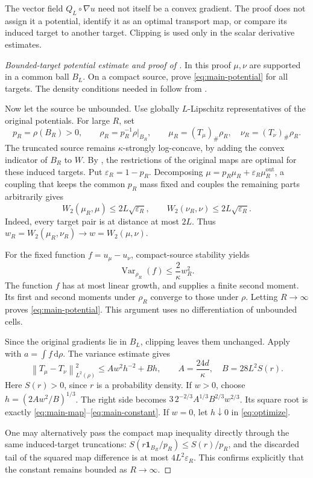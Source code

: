 \documentclass[11pt]{article}
\numberwithin{equation}{section}
\theoremstyle{remark}
\newcommand{\Var}{\operatorname{Var}}
\newcommand{\ind}{\mathbf 1}
\newcommand{\dd}{\,\mathrm d}
\newcommand{\norm}[1]{\left\lVert #1\right\rVert}
\begin{document}
The vector field $Q_L\circ\nabla u$ need not itself be a convex gradient. The proof does not assign it a potential, identify it as an optimal transport map, or compare its induced target to another target. Clipping is used only in the scalar derivative estimates.

\begin{proof}[Bounded-target potential estimate and proof of ]
In this proof $\mu,\nu$ are supported in a common ball $B_L$. On a compact source,  prove \eqref{eq:main-potential} for all targets. The density conditions needed in  follow from .

Now let the source be unbounded. Use globally $L$-Lipschitz representatives of the original potentials. For large $R$, set
\[
 p_R=\rho(B_R)>0,\qquad \rho_R=p_R^{-1}\rho|_{B_R},\qquad
 \mu_R=(T_\mu)_\#\rho_R,\quad \nu_R=(T_\nu)_\#\rho_R.
\]
The truncated source remains $\kappa$-strongly log-concave, by adding the convex indicator of $B_R$ to $W$. By , the restrictions of the original maps are optimal for these induced targets. Put $\varepsilon_R=1-p_R$. Decomposing
$\mu=p_R\mu_R+\varepsilon_R\mu_R^{\mathrm{out}}$, a coupling that keeps the common $p_R$ mass fixed and couples the remaining parts arbitrarily gives
\begin{equation}\label{eq:induced-target-bound}
 W_2(\mu_R,\mu)\le2L\sqrt{\varepsilon_R},\qquad
 W_2(\nu_R,\nu)\le2L\sqrt{\varepsilon_R}.
\end{equation}
Indeed, every target pair is at distance at most $2L$. Thus $w_R=W_2(\mu_R,\nu_R)\to w=W_2(\mu,\nu)$.

For the fixed function $f=u_\mu-u_\nu$, compact-source stability yields
\[
 \Var_{\rho_R}(f)\le\frac2\kappa w_R^2.
\]
The function $f$ has at most linear growth, and  supplies a finite second moment. Its first and second moments under $\rho_R$ converge to those under $\rho$. Letting $R\to\infty$ proves \eqref{eq:main-potential}. This argument uses no differentiation of unbounded cells.

Since the original gradients lie in $B_L$, clipping leaves them unchanged. Apply  with $a=\int f\dd\rho$. The variance estimate gives
\begin{equation}\label{eq:optimize}
 \norm{T_\mu-T_\nu}_{L^2(\rho)}^2
 \le A w^2h^{-2}+Bh,
 \qquad A=\frac{24d}\kappa,\quad B=28L^2S(r).
\end{equation}
Here $S(r)>0$, since $r$ is a probability density. If $w>0$, choose
$h=(2Aw^2/B)^{1/3}$. The right side becomes
$3\,2^{-2/3}A^{1/3}B^{2/3}w^{2/3}$. Its square root is exactly \eqref{eq:main-map}--\eqref{eq:main-constant}. If $w=0$, let $h\downarrow0$ in \eqref{eq:optimize}.

One may alternatively pass the compact map inequality directly through the same induced-target truncations: $S(r\ind_{B_R}/p_R)\le S(r)/p_R$, and the discarded tail of the squared map difference is at most $4L^2\varepsilon_R$. This confirms explicitly that the constant remains bounded as $R\to\infty$.
\end{proof}
\end{document}
